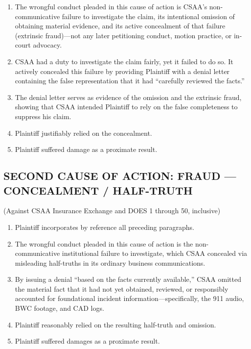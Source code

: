 \begin{enumerate}
\def\labelenumi{\arabic{enumi}.}
\setcounter{enumi}{52}
\item
  The wrongful conduct pleaded in this cause of action is CSAA's non-communicative failure to investigate the claim, its intentional omission of obtaining material evidence, and its active concealment of that failure (extrinsic fraud)---not any later petitioning conduct, motion practice, or in-court advocacy.
\item
  CSAA had a duty to investigate the claim fairly, yet it failed to do so. It actively concealed this failure by providing Plaintiff with a denial letter containing the false representation that it had ``carefully reviewed the facts.''
\item
  The denial letter serves as evidence of the omission and the extrinsic fraud, showing that CSAA intended Plaintiff to rely on the false completeness to suppress his claim.
\item
  Plaintiff justifiably relied on the concealment.
\item
  Plaintiff suffered damage as a proximate result.
\end{enumerate}

\subsection{SECOND CAUSE OF ACTION: FRAUD --- CONCEALMENT / HALF-TRUTH}\label{second-cause-of-action-fraud-concealment-half-truth}

(Against CSAA Insurance Exchange and DOES 1 through 50, inclusive)

\begin{enumerate}
\def\labelenumi{\arabic{enumi}.}
\setcounter{enumi}{57}
\item
  Plaintiff incorporates by reference all preceding paragraphs.
\item
  The wrongful conduct pleaded in this cause of action is the non-communicative institutional failure to investigate, which CSAA concealed via misleading half-truths in its ordinary business communications.
\item
  By issuing a denial ``based on the facts currently available,'' CSAA omitted the material fact that it had not yet obtained, reviewed, or responsibly accounted for foundational incident information---specifically, the 911 audio, BWC footage, and CAD logs.
\item
  Plaintiff reasonably relied on the resulting half-truth and omission.
\item
  Plaintiff suffered damages as a proximate result.
\end{enumerate}

